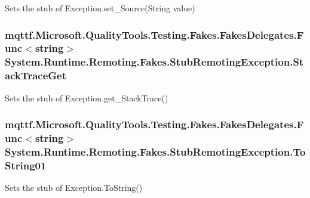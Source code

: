 Sets the stub of Exception.\-set\-\_\-\-Source(\-String value)

\hypertarget{class_system_1_1_runtime_1_1_remoting_1_1_fakes_1_1_stub_remoting_exception_a0c1822ae3bdb601d432c6b057480dfa2}{
\subsubsection[{Stack\-Trace\-Get}]{\setlength{\rightskip}{0pt plus 5cm}mqttf.\-Microsoft.\-Quality\-Tools.\-Testing.\-Fakes.\-Fakes\-Delegates.\-Func$<$string$>$ System.\-Runtime.\-Remoting.\-Fakes.\-Stub\-Remoting\-Exception.\-Stack\-Trace\-Get}}\label{class_system_1_1_runtime_1_1_remoting_1_1_fakes_1_1_stub_remoting_exception_a0c1822ae3bdb601d432c6b057480dfa2}


Sets the stub of Exception.\-get\-\_\-\-Stack\-Trace()

\hypertarget{class_system_1_1_runtime_1_1_remoting_1_1_fakes_1_1_stub_remoting_exception_a27de598daf1c50dd0f06e7a364905724}{
\subsubsection[{To\-String01}]{\setlength{\rightskip}{0pt plus 5cm}mqttf.\-Microsoft.\-Quality\-Tools.\-Testing.\-Fakes.\-Fakes\-Delegates.\-Func$<$string$>$ System.\-Runtime.\-Remoting.\-Fakes.\-Stub\-Remoting\-Exception.\-To\-String01}}\label{class_system_1_1_runtime_1_1_remoting_1_1_fakes_1_1_stub_remoting_exception_a27de598daf1c50dd0f06e7a364905724}


Sets the stub of Exception.\-To\-String()



